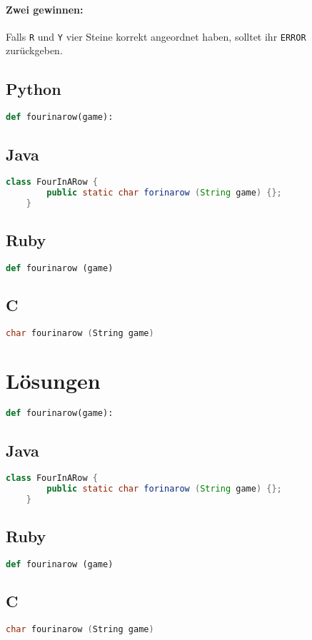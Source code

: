 \documentclass[a4paper]{article}
\begin{document}
\paragraph{Zwei \glqq gewinnen\grqq:} Falls \texttt{R} und \texttt{Y} vier Steine korrekt angeordnet haben, solltet ihr \texttt{ERROR} zurückgeben.
\subsection*{Python}
\begin{lstlisting}[language=Python]
	def fourinarow(game):
\end{lstlisting}
\subsection*{Java}
\begin{lstlisting}[language=Java]
	class FourInARow {
		public static char forinarow (String game) {};
	}
\end{lstlisting}
\subsection*{Ruby}
\begin{lstlisting}[language=Ruby]
	def fourinarow (game)
\end{lstlisting}
\subsection*{C}
\begin{lstlisting}[language=C]
	char fourinarow (String game)
\end{lstlisting}
\newpage
\onecolumn
\section*{Lösungen}
\begin{lstlisting}[language=Python]
	def fourinarow(game):
\end{lstlisting}
\subsection*{Java}
\begin{lstlisting}[language=Java]
	class FourInARow {
		public static char forinarow (String game) {};
	}
\end{lstlisting}
\subsection*{Ruby}
\begin{lstlisting}[language=Ruby]
	def fourinarow (game)
\end{lstlisting}
\subsection*{C}
\begin{lstlisting}[language=C]
	char fourinarow (String game)
\end{lstlisting}
\end{document}
